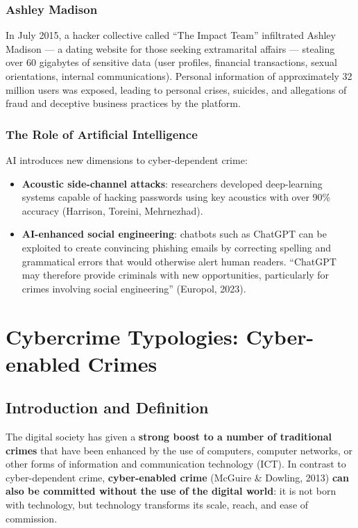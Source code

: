 \documentclass[11pt,a4paper,openany]{report}
\theoremstyle{definition}
\theoremstyle{plain}
\theoremstyle{remark}
\begin{document}
\subsection{Ashley Madison}

In July 2015, a hacker collective called ``The Impact Team'' infiltrated Ashley Madison --- a dating website for those seeking extramarital affairs --- stealing over 60 gigabytes of sensitive data (user profiles, financial transactions, sexual orientations, internal communications). Personal information of approximately 32 million users was exposed, leading to personal crises, suicides, and allegations of fraud and deceptive business practices by the platform.

\subsection{The Role of Artificial Intelligence}

AI introduces new dimensions to cyber-dependent crime:

\begin{itemize}
    \item \textbf{Acoustic side-channel attacks}: researchers developed deep-learning systems capable of hacking passwords using key acoustics with over 90\% accuracy (Harrison, Toreini, Mehrnezhad).
    \item \textbf{AI-enhanced social engineering}: chatbots such as ChatGPT can be exploited to create convincing phishing emails by correcting spelling and grammatical errors that would otherwise alert human readers. ``ChatGPT may therefore provide criminals with new opportunities, particularly for crimes involving social engineering'' (Europol, 2023).
\end{itemize}



\chapter{Cybercrime Typologies: Cyber-enabled Crimes}

\section{Introduction and Definition}

The digital society has given a \textbf{strong boost to a number of traditional crimes} that have been enhanced by the use of computers, computer networks, or other forms of information and communication technology (ICT). In contrast to cyber-dependent crime, \textbf{cyber-enabled crime} (McGuire \& Dowling, 2013) \textbf{can also be committed without the use of the digital world}: it is not born with technology, but technology transforms its scale, reach, and ease of commission.
\end{document}

